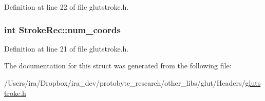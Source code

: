 Definition at line 22 of file glutstroke.\-h.

\hypertarget{struct_stroke_rec_a04099f831b56c1f4ff6e12e853eb812f}{
\subsubsection[{num\-\_\-coords}]{\setlength{\rightskip}{0pt plus 5cm}int Stroke\-Rec\-::num\-\_\-coords}}\label{struct_stroke_rec_a04099f831b56c1f4ff6e12e853eb812f}


Definition at line 21 of file glutstroke.\-h.



The documentation for this struct was generated from the following file\-:\begin{DoxyCompactItemize}
\item 
/\-Users/ira/\-Dropbox/ira\-\_\-dev/protobyte\-\_\-research/other\-\_\-libs/glut/\-Headers/\hyperlink{glutstroke_8h}{glutstroke.\-h}\end{DoxyCompactItemize}
